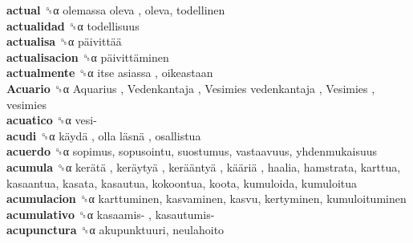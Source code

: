 \textbf{actual} ␝α   olemassa oleva , oleva, todellinen  \\
\textbf{actualidad} ␝α  todellisuus  \\
\textbf{actualisa} ␝α   päivittää   \\
\textbf{actualisacion} ␝α   päivittäminen   \\
\textbf{actualmente} ␝α   itse asiassa , oikeastaan  \\
\textbf{Acuario} ␝α   Aquarius ,  Vedenkantaja ,  Vesimies vedenkantaja ,  Vesimies , vesimies  \\
\textbf{acuatico} ␝α   vesi-   \\
\textbf{acudi} ␝α   käydä ,  olla läsnä , osallistua  \\
\textbf{acuerdo} ␝α  sopimus, sopusointu, suostumus, vastaavuus, yhdenmukaisuus  \\
\textbf{acumula} ␝α   kerätä ,  keräytyä ,  kerääntyä ,  kääriä , haalia, hamstrata, karttua, kasaantua, kasata, kasautua, kokoontua, koota, kumuloida, kumuloitua  \\
\textbf{acumulacion} ␝α  karttuminen, kasvaminen, kasvu, kertyminen, kumuloituminen  \\
\textbf{acumulativo} ␝α   kasaamis- ,  kasautumis-   \\
\textbf{acupunctura} ␝α  akupunktuuri, neulahoito  \\
